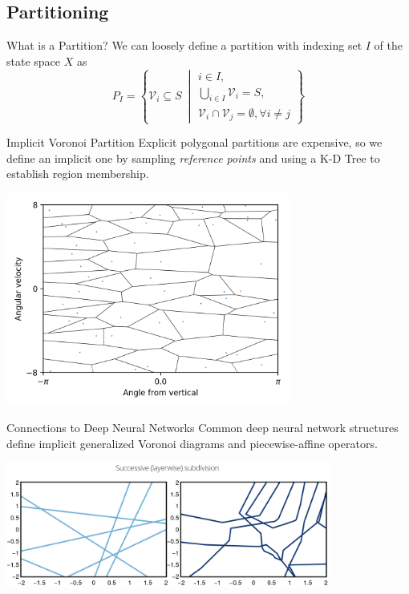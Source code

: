 \documentclass{beamer}
\begin{document}
\subsection{Partitioning}

\begin{frame}{What is a Partition?}
  We can loosely define a partition with indexing set $I$ of the state space $X$ as
  \begin{equation}
    P_I = \left\{\mathcal{V}_i \subseteq S\ \middle\vert 
      \begin{array}{l}
        i \in I, \\
        \bigcup_{i \in I}\mathcal{V}_i = S, \\
        \mathcal{V}_i \cap \mathcal{V}_j = \emptyset, \forall i \neq j
      \end{array}\right\}
  \end{equation}
\end{frame}

\begin{frame}{Implicit Voronoi Partition}
  Explicit polygonal partitions are expensive, so we define an implicit one by
  sampling \emph{reference points} and using a K-D Tree to establish region membership.

  \begin{center}
    \includegraphics[keepaspectratio,width=0.7\textwidth]{assets/pendulum_voronoi}
  \end{center}
\end{frame}

\begin{frame}{Connections to Deep Neural Networks}
  Common deep neural network structures define implicit generalized Voronoi
  diagrams and piecewise-affine operators. 

  \begin{center}
    \includegraphics[keepaspectratio,width=0.8\textwidth]{assets/subdivision}
  \end{center}
\end{frame}
\end{document}
